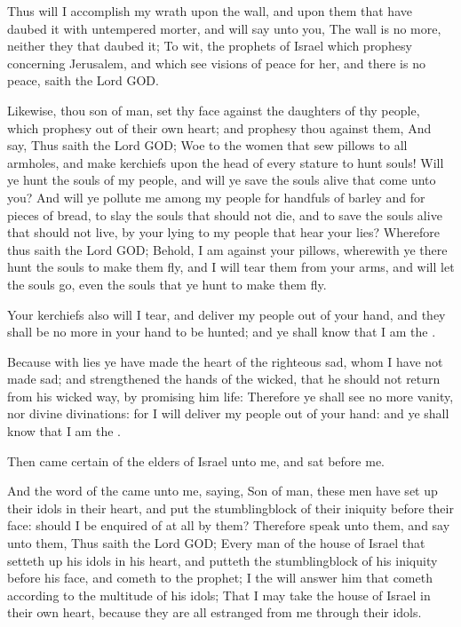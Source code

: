 \Verse Thus will I accomplish my wrath upon the wall, and upon them that have daubed it with untempered morter, and will say unto you, The wall is no more, neither they that daubed it; \Verse To wit, the prophets of Israel which prophesy concerning Jerusalem, and which see visions of peace for her, and there is no peace, saith the Lord GOD.

\Verse Likewise, thou son of man, set thy face against the daughters of thy people, which prophesy out of their own heart; and prophesy thou against them, \Verse And say, Thus saith the Lord GOD; Woe to the women that sew pillows to all armholes, and make kerchiefs upon the head of every stature to hunt souls! Will ye hunt the souls of my people, and will ye save the souls alive that come unto you?  \Verse And will ye pollute me among my people for handfuls of barley and for pieces of bread, to slay the souls that should not die, and to save the souls alive that should not live, by your lying to my people that hear your lies?  \Verse Wherefore thus saith the Lord GOD; Behold, I am against your pillows, wherewith ye there hunt the souls to make them fly, and I will tear them from your arms, and will let the souls go, even the souls that ye hunt to make them fly.

\Verse Your kerchiefs also will I tear, and deliver my people out of your hand, and they shall be no more in your hand to be hunted; and ye shall know that I am the \LORD.

\Verse Because with lies ye have made the heart of the righteous sad, whom I have not made sad; and strengthened the hands of the wicked, that he should not return from his wicked way, by promising him life: \Verse Therefore ye shall see no more vanity, nor divine divinations: for I will deliver my people out of your hand: and ye shall know that I am the \LORD.


\Chapter
\Verse Then came certain of the elders of Israel unto me, and sat before me.

\Verse And the word of the \LORD came unto me, saying, \Verse Son of man, these men have set up their idols in their heart, and put the stumblingblock of their iniquity before their face: should I be enquired of at all by them?  \Verse Therefore speak unto them, and say unto them, Thus saith the Lord GOD; Every man of the house of Israel that setteth up his idols in his heart, and putteth the stumblingblock of his iniquity before his face, and cometh to the prophet; I the \LORD will answer him that cometh according to the multitude of his idols; \Verse That I may take the house of Israel in their own heart, because they are all estranged from me through their idols.

